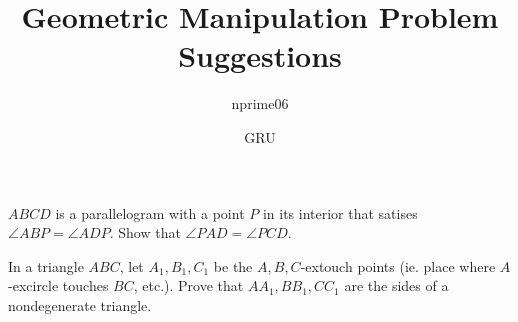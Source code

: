 \documentclass{article}
\title{Geometric Manipulation Problem Suggestions}
\author{nprime06}
\date{GRU}
\begin{document}
\maketitle

\begin{prob}[nprime06]{}
$ABCD$ is a parallelogram with a point $P$ in its interior that satises $\angle ABP = \angle ADP$. Show that $\angle PAD = \angle PCD$.
\end{prob}

\begin{prob}[Tuymaada 2005]{}
In a triangle $ABC$, let $A_1,B_1,C_1$ be the $A,B,C$-extouch points (ie. place where $A$-excircle touches $BC$, etc.). Prove that $AA_1,BB_1,CC_1$ are the sides of a nondegenerate triangle. 
\end{prob}
\end{document}
